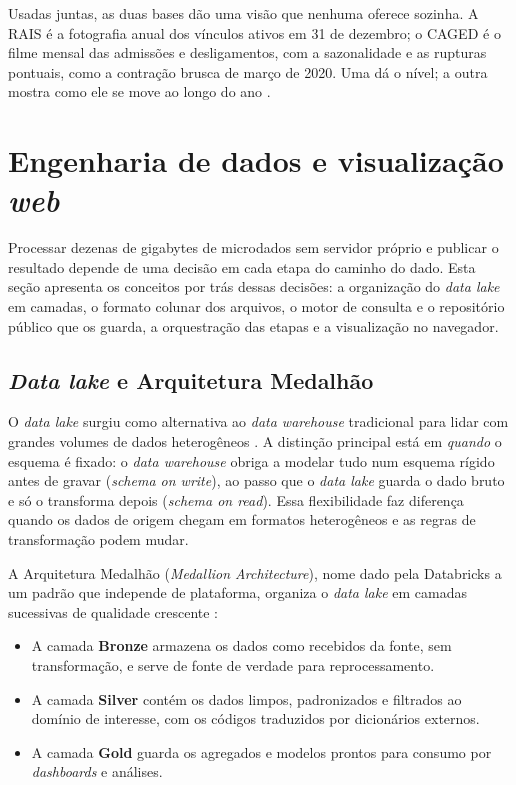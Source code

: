 Usadas juntas, as duas bases dão uma visão que nenhuma oferece sozinha. A RAIS é a fotografia anual dos vínculos ativos em 31 de dezembro; o CAGED é o filme mensal das admissões e desligamentos, com a sazonalidade e as rupturas pontuais, como a contração brusca de março de 2020. Uma dá o nível; a outra mostra como ele se move ao longo do ano \cite{RAIS2024, CAGED2024}.

\section{Engenharia de dados e visualização \textit{web}}

Processar dezenas de gigabytes de microdados sem servidor próprio e publicar o resultado depende de uma decisão em cada etapa do caminho do dado. Esta seção apresenta os conceitos por trás dessas decisões: a organização do \textit{data lake} em camadas, o formato colunar dos arquivos, o motor de consulta e o repositório público que os guarda, a orquestração das etapas e a visualização no navegador.

\subsection{\textit{Data lake} e Arquitetura Medalhão}
\label{subsec:medalhao}

O \textit{data lake} surgiu como alternativa ao \textit{data warehouse} tradicional para lidar com grandes volumes de dados heterogêneos \cite{Reis2022}. A distinção principal está em \textit{quando} o esquema é fixado: o \textit{data warehouse} obriga a modelar tudo num esquema rígido antes de gravar (\textit{schema on write}), ao passo que o \textit{data lake} guarda o dado bruto e só o transforma depois (\textit{schema on read}). Essa flexibilidade faz diferença quando os dados de origem chegam em formatos heterogêneos e as regras de transformação podem mudar.

A Arquitetura Medalhão (\textit{Medallion Architecture}), nome dado pela Databricks a um padrão que independe de plataforma, organiza o \textit{data lake} em camadas sucessivas de qualidade crescente \cite{MicrosoftMedallion2024}: 
\begin{itemize}
    \item A camada \textbf{Bronze} armazena os dados como recebidos da fonte, sem transformação, e serve de fonte de verdade para reprocessamento. 

    \item A camada \textbf{Silver} contém os dados limpos, padronizados e filtrados ao domínio de interesse, com os códigos traduzidos por dicionários externos. 

    \item A camada \textbf{Gold} guarda os agregados e modelos prontos para consumo por \textit{dashboards} e análises. 
\end{itemize}

